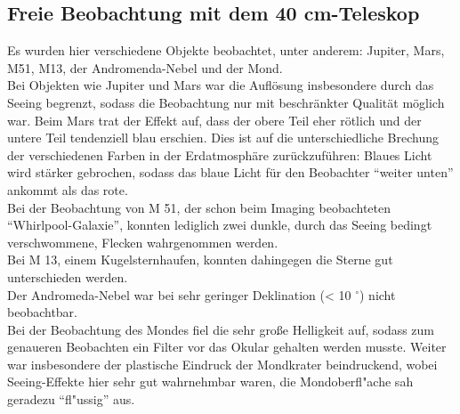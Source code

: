 \subsection{Freie Beobachtung mit dem 40 cm-Teleskop}
Es wurden hier verschiedene Objekte beobachtet, unter anderem: Jupiter, Mars, M51, M13, der Andromenda-Nebel und der Mond. \\
Bei Objekten wie Jupiter und Mars war die Auflösung insbesondere durch das Seeing begrenzt, sodass die Beobachtung nur mit beschränkter Qualität möglich war. Beim Mars trat der Effekt auf, dass der obere Teil eher rötlich und der untere Teil tendenziell blau erschien. Dies ist auf die unterschiedliche Brechung der verschiedenen Farben in der Erdatmosphäre zurückzuführen: Blaues Licht wird stärker gebrochen, sodass das blaue Licht für den Beobachter \enquote{weiter unten} ankommt als das rote. \\
Bei der Beobachtung von M 51, der schon beim Imaging beobachteten \enquote{Whirlpool-Galaxie}, konnten lediglich zwei dunkle, durch das Seeing bedingt verschwommene, Flecken wahrgenommen werden. \\
Bei M 13, einem Kugelsternhaufen, konnten dahingegen die Sterne gut unterschieden werden. \\
Der Andromeda-Nebel war bei sehr geringer Deklination (< 10 $^\circ$) nicht beobachtbar. \\
Bei der Beobachtung des Mondes fiel die sehr große Helligkeit auf, sodass zum genaueren Beobachten ein Filter vor das Okular gehalten werden musste. Weiter war insbesondere der plastische Eindruck der Mondkrater beindruckend, wobei Seeing-Effekte hier sehr gut wahrnehmbar waren, die Mondoberfl"ache sah geradezu \enquote{fl"ussig} aus.\\
